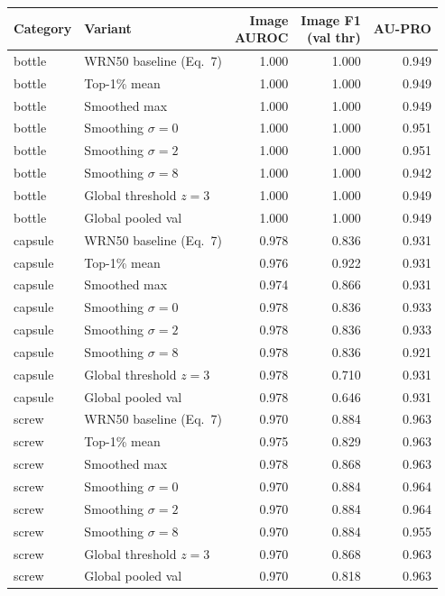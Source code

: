 \begin{tabular}{@{}llrrr@{}}
\toprule
Category & Variant & \shortstack{Image\\AUROC} & \shortstack{Image F1\\(val thr)} & AU-PRO \\
\midrule
bottle & WRN50 baseline (Eq.~7) & 1.000 & 1.000 & 0.949 \\
bottle & Top-1\% mean & 1.000 & 1.000 & 0.949 \\
bottle & Smoothed max & 1.000 & 1.000 & 0.949 \\
bottle & Smoothing $\sigma=0$ & 1.000 & 1.000 & 0.951 \\
bottle & Smoothing $\sigma=2$ & 1.000 & 1.000 & 0.951 \\
bottle & Smoothing $\sigma=8$ & 1.000 & 1.000 & 0.942 \\
bottle & Global threshold $z=3$ & 1.000 & 1.000 & 0.949 \\
bottle & Global pooled val & 1.000 & 1.000 & 0.949 \\
\midrule
capsule & WRN50 baseline (Eq.~7) & 0.978 & 0.836 & 0.931 \\
capsule & Top-1\% mean & 0.976 & 0.922 & 0.931 \\
capsule & Smoothed max & 0.974 & 0.866 & 0.931 \\
capsule & Smoothing $\sigma=0$ & 0.978 & 0.836 & 0.933 \\
capsule & Smoothing $\sigma=2$ & 0.978 & 0.836 & 0.933 \\
capsule & Smoothing $\sigma=8$ & 0.978 & 0.836 & 0.921 \\
capsule & Global threshold $z=3$ & 0.978 & 0.710 & 0.931 \\
capsule & Global pooled val & 0.978 & 0.646 & 0.931 \\
\midrule
screw & WRN50 baseline (Eq.~7) & 0.970 & 0.884 & 0.963 \\
screw & Top-1\% mean & 0.975 & 0.829 & 0.963 \\
screw & Smoothed max & 0.978 & 0.868 & 0.963 \\
screw & Smoothing $\sigma=0$ & 0.970 & 0.884 & 0.964 \\
screw & Smoothing $\sigma=2$ & 0.970 & 0.884 & 0.964 \\
screw & Smoothing $\sigma=8$ & 0.970 & 0.884 & 0.955 \\
screw & Global threshold $z=3$ & 0.970 & 0.868 & 0.963 \\
screw & Global pooled val & 0.970 & 0.818 & 0.963 \\

\end{tabular}
